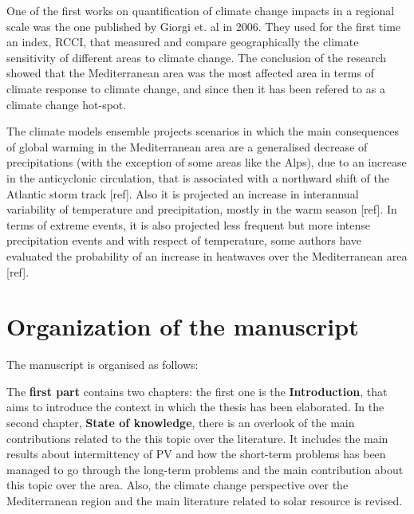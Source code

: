 One of the first works on quantification of climate change impacts in a regional scale was the one published by Giorgi et. al in 2006. They used for the first time an index, RCCI, that measured and compare geographically the climate sensitivity of different areas to climate change. The conclusion of the research showed that the Mediterranean area was the most affected area in terms of climate response to climate change, and since then it has been refered to as a climate change hot-spot.


The climate models ensemble projects scenarios in which the main consequences of global warming in the Mediterranean area are a generalised decrease of precipitations (with the exception of some areas like the Alps), due to an increase in the anticyclonic circulation, that is associated with a northward shift of the Atlantic storm track [ref]. Also it is projected an increase in interannual variability of temperature and precipitation, mostly in the warm season [ref]. In terms of extreme events, it is also projected less frequent but more intense precipitation events and with respect of temperature, some authors have evaluated the probability of an increase in heatwaves over the Mediterranean area [ref].   

\section{Organization of the manuscript}%

The manuscript is organised as follows:

The \textbf{first part} contains two chapters: the first one is the \textbf{Introduction}, that aims to introduce the context in which the thesis has been elaborated. In the second chapter, \textbf{State of knowledge}, there is an overlook of the main contributions related to the this topic over the literature. It includes the main results about intermittency of PV and how the short-term problems has been managed to go through the long-term problems and the main contribution about this topic over the area. Also, the climate change perspective over the Mediterranean region and the main literature related to solar resource is revised.

